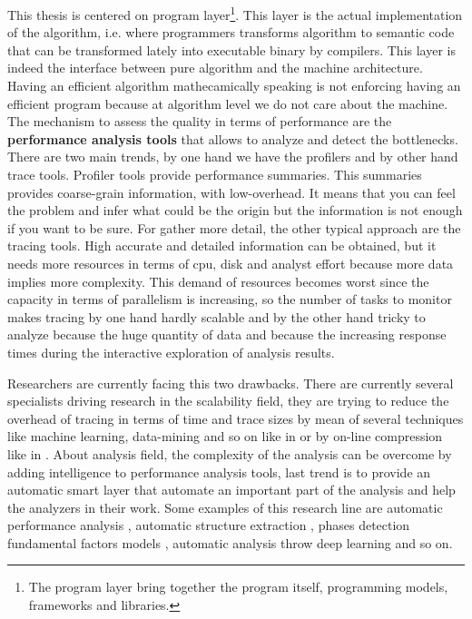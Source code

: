 \documentclass[12pt]{report}
\begin{document}
This thesis is centered on program layer\footnote{The program layer 
bring together the program itself, programming models, frameworks and libraries.}. 
This layer is the actual implementation of the algorithm, i.e. where programmers
transforms algorithm to  semantic code that can be transformed lately into
executable binary by compilers. This layer is indeed the interface between pure 
algorithm and the machine architecture. Having an efficient algorithm
mathecamically speaking is not enforcing having an efficient program 
because at algorithm level we do not care about the machine. 
The mechanism to assess the quality in terms of performance are the {\bf performance 
analysis tools} that allows to analyze and detect the bottlenecks. 
There are two main trends, by one hand we have the profilers and by other hand trace
tools. Profiler tools provide performance summaries. This summaries provides 
coarse-grain information, with low-overhead. It means that you can feel the problem 
and infer what could be the origin but the information is not enough if you want 
to be sure. For gather more detail, the other typical approach are the tracing 
tools. High accurate and detailed information can be obtained, but it needs 
more resources in terms of cpu, disk and analyst effort because more data implies 
more complexity. This demand of resources becomes worst since the capacity in 
terms of parallelism is increasing, so the number of tasks to monitor makes 
tracing by one hand hardly scalable and by the other hand tricky to analyze
because the huge quantity of data and because the increasing response times
during the interactive exploration of analysis results. 

Researchers are currently facing this two drawbacks. There are currently several
specialists driving research in the scalability field, they are trying to reduce 
the overhead of tracing in terms of time and trace sizes by mean of several 
techniques like machine learning, data-mining and so on like in 
\cite{llort2015intelligent} or by on-line compression like in
\cite{noeth2009scalatrace}. About analysis field, the complexity of the analysis 
can be overcome by adding intelligence to performance analysis tools, last 
trend is to provide an automatic smart layer that automate an important part 
of the analysis and help the analyzers in their work. Some examples of this 
research line are automatic performance analysis \cite{wolf2003automatic}, 
automatic structure extraction \cite{casas2007automatic}, phases detection 
\cite{gonzalez2013application} fundamental factors models \cite{casas2008aass}, 
automatic analysis throw deep learning \cite{simon:2017:perfdp} and so on.
\end{document}

